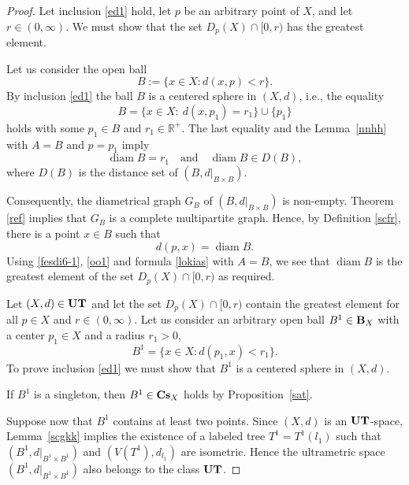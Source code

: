 \documentclass{article}
\begin{document}
\begin{proof}
Let inclusion \eqref{ed1} hold, let $p$ be an arbitrary point of $X$, and let
$r\in(0,\infty)$.
We must show that the set $D_p(X)\cap[0,r)$ has the greatest element. 

Let us consider the open ball
\begin{equation}\label{oo1}
    B:=\{x\in X \colon d(x,p)<r\}.
\end{equation}
 By inclusion \eqref{ed1} the ball $B$ is a centered sphere in $(X,d)$, i.e., the equality
\[
B=\{x\in X\colon \ d(x,p_1)=r_1\}\cup\{p_1\}
\]
holds with some $p_1\in B$ and $r_1\in \mathbb R^+$. The last equality and the Lemma~\ref{nnhh}  with $A=B$ and $p=p_1$ imply 
\[
\operatorname{diam} B=r_1 \quad \text{and} \quad
 \operatorname{diam} B\in D(B),
\]
where $D(B)$ is the distance set of $(B,d|_{B\times B})$.

Consequently, the diametrical graph \(G_B\) of \((B,d|_{B\times B})\) is non-empty.
Theorem \ref{ref} implies that \(G_B\) is a complete multipartite graph.
Hence, by Definition \ref{scfr}, there is a point \(x\in B\) such that
\begin{equation*}
d(p,x)=\operatorname{diam} B.
\end{equation*}
Using \eqref{fesdi6-1}, \eqref{oo1} and formula \eqref{lokias} with \(A=B\), we see that \(\operatorname{diam} B\) is the greatest element of the set \(D_p(X)\cap[0,r)\) as required.


Let $(X,d)\in {\bf UT}$ and let the set $D_p(X)\cap [0,r)$ contain the greatest element for all $p\in X$ and $r\in (0,\infty)$.
Let us consider an arbitrary open ball $B^1\in {\bf B}_X$ with  a center $p_1\in X$ and a radius $r_1>0$,
\begin{equation}
    \label{nn1}
    B^1=\{x\in X \colon d(p_1,x)<r_1\}.
\end{equation}
To prove inclusion \eqref{ed1} we must show that $B^1$ is a centered sphere in $(X,d)$.

If $B^1$ is a singleton, then $B^1\in {\bf Cs}_X$ holds by Proposition~\ref{sat}. 

Suppose now that $B^1$ contains at least two points.
Since $(X,d)$ is an ${\bf UT}$-space, Lemma~\ref{scgkk} implies the existence of a labeled tree
$T^{1}=T^{1}(l_{1})$ such that
$(B^1,d|_{B^{1}\times B^{1}})$ and $(V(T^{1}),d_{l_1})$
are isometric.
Hence the ultrametric space $(B^{1},d|_{B^{1}\times B^{1}})$ also belongs to the class
${\bf UT}$.


\end{proof}
\end{document}
